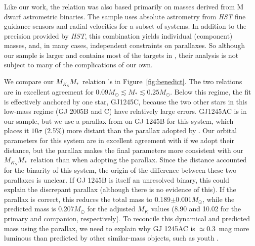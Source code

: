 \documentclass[twocolumn]{aastex62}
\newcommand{\mmk}{$M_{K_S}$\textendash$M_*$}
\begin{document}
\subsubsection{\citet{Benedict2016}}
Like our work, the \citet{Benedict2016} relation was also based primarily on masses derived from M dwarf astrometric binaries. The \citet{Benedict2016} sample uses absolute astrometry from {\it HST} fine guidance sensors and radial velocities for a subset of systems. In addition to the precision provided by {\it HST}, this combination yields individual (component) masses, and, in many cases, independent constraints on parallaxes. So although our sample is larger and contains most of the targets in \citet{Benedict2016}, their analysis is not subject to many of the complications of our own. 

We compare our \mmk\ relation \citet{Benedict2016}'s in Figure~\ref{fig:benedict}. The two relations are in excellent agreement for $0.09M_\odot\lesssim M_* \lesssim 0.25M_\odot$. Below this regime, the \citet{Benedict2016} fit is effectively anchored by one star, GJ1245C, because the two other stars in this low-mass regime (GJ 2005B and C) have relatively large errors. GJ1245AC is in our sample, but we use a parallax from \citet{GaiaDr2} on GJ 1245B for this system, which places it $10\sigma$ (2.5\%) more distant than the parallax adopted by \citet{Benedict2016}. Our orbital parameters for this system are in excellent agreement with \citet{Benedict2016} if we adopt their distance, but the \citet{GaiaDr2} parallax makes the final parameters more consistent with our \mmk\ relation than when adopting the \citet{Benedict2016} parallax. Since the \citet{Benedict2016} distance accounted for the binarity of this system, the origin of the difference between these two parallaxes is unclear. If GJ 1245B is itself an unresolved binary, this could explain the discrepant parallax (although there is no evidence of this). If the \citet{Benedict2016} parallax is correct, this reduces the total mass to 0.189$\pm$0.001$M_\odot$, while the predicted mass is 0.207$M_\odot$ for the adjusted $M_K$ values (8.90 and 10.02 for the primary and companion, respectively). To reconcile this dynamical and predicted mass using the \citet{Benedict2016} parallax, we need to explain why GJ 1245AC is $\simeq$0.3~mag more luminous than predicted by other similar-mass objects, such as youth \citep{2015ApJ...800...95L,2017ApJ...834...85N}. 
\end{document}

